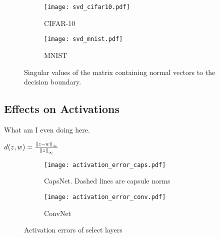 \begin{figure}
	\centering
	\begin{subfigure}{\textwidth}
		\texttt{[image: svd\_cifar10.pdf]}
		\caption{CIFAR-10}
	\end{subfigure}
	\begin{subfigure}{\textwidth}
		\texttt{[image: svd\_mnist.pdf]}
		\caption{MNIST}
	\end{subfigure}
	
	\caption{Singular values of the matrix containing normal vectors to the decision boundary.}
	\label{fig:svd}
\end{figure}

\subsection{Effects on Activations}
What am I even doing here.

$d(z, w) = \frac{\norm[\infty]{z - w}}{\norm[\infty]{z}}$

\begin{figure}
	\centering
	\begin{subfigure}{\textwidth}
		\texttt{[image: activation\_error\_caps.pdf]}
		\caption{CapsNet. Dashed lines are capsule norms}
	\end{subfigure}
		\begin{subfigure}{\textwidth}
		\texttt{[image: activation\_error\_conv.pdf]}
		\caption{ConvNet}
	\end{subfigure}

	\caption[Activation errors]{Activation errors of select layers}
	\label{fig:activation}
\end{figure}